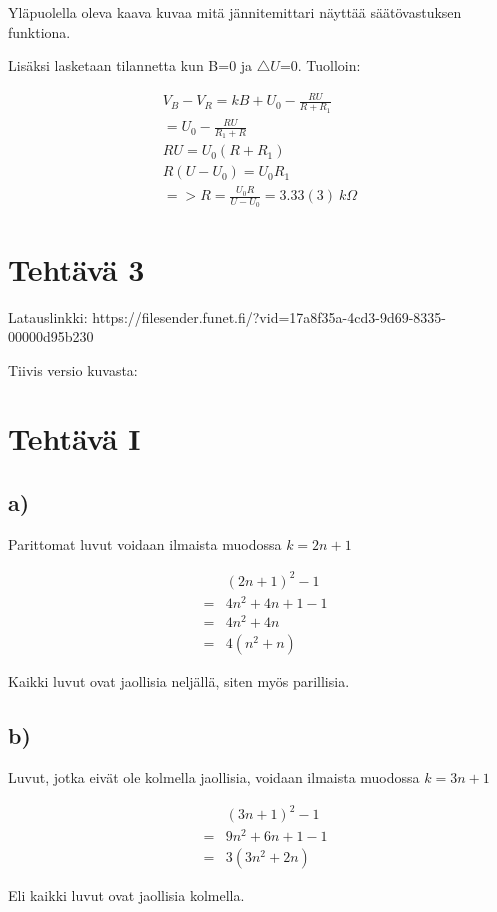 \documentclass[a4paper, 12pt]{article}
\begin{document}
Yläpuolella oleva kaava kuvaa mitä jännitemittari näyttää säätövastuksen funktiona.

Lisäksi lasketaan tilannetta kun B=0 ja $\triangle U$=0. Tuolloin:

\begin{center}
\begin{eqnarray*}
V_B - V_R = k B + U_0 - \frac{R U}{R + R_1} \\
= U_0 - \frac{R U}{R_1 + R} \\
R U = U_0 (R +R_1) \\
R (U-U_0) = U_0 R_1 \\
=> R = \frac{U_0 R}{U-U_0} = 3.33(3)\ k\Omega
\end{eqnarray*}
\end{center}

\section*{Tehtävä 3}
Latauslinkki: https://filesender.funet.fi/?vid=17a8f35a-4cd3-9d69-8335-00000d95b230 

Tiivis versio kuvasta:

\begin{figure}[!hbt]
\end{figure}


\iffalse
\section*{Tehtävä I}
\subsection*{a)}
Parittomat luvut voidaan ilmaista muodossa $k=2n+1$
\begin{center}
\begin{eqnarray*}
&& \left(2n+1\right)^2-1 \\ 
& = & 4n^2+4n+1-1 \\
& = & 4n^2+4n \\
& = & 4\left(n^2+n\right)
\end{eqnarray*}
\end{center}
Kaikki luvut ovat jaollisia neljällä, siten myös parillisia.
\subsection*{b)}
Luvut, jotka eivät ole kolmella jaollisia, voidaan ilmaista muodossa $k=3n+1$

\begin{center}
\begin{eqnarray*}
&& \left(3n+1\right)^2-1 \\
& = & 9n^2+6n+1-1 \\
& = & 3\left(3n^2+2n\right)
\end{eqnarray*}
\end{center}
Eli kaikki luvut ovat jaollisia kolmella.
\end{document}
